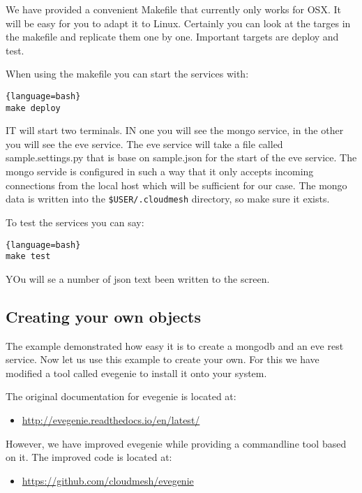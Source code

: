We have provided a convenient Makefile that currently only works for
OSX. It will be easy for you to adapt it to Linux. Certainly you can
look at the targes in the makefile and replicate them one by one.
Important targets are deploy and test.

When using the makefile you can start the services with:

\begin{lstlisting}{language=bash}
make deploy
\end{lstlisting}

IT will start two terminals. IN one you will see the mongo service, in
the other you will see the eve service. The eve service will take a file
called sample.settings.py that is base on sample.json for the start of
the eve service. The mongo servide is configured in such a way that it
only accepts incoming connections from the local host which will be
sufficient for our case. The mongo data is written into the
\verb|$USER/.cloudmesh| directory, so make sure it exists.

To test the services you can say:

\begin{lstlisting}{language=bash}
make test
\end{lstlisting}

YOu will se a number of json text been written to the screen.

\subsection{Creating your own objects}\label{creating-your-own-objects}

The example demonstrated how easy it is to create a mongodb and an eve
rest service. Now let us use this example to create your own. For
this we have modified a tool called evegenie to install it onto your
system.

The original documentation for evegenie is located at:

\begin{itemize}
\item
 \url{http://evegenie.readthedocs.io/en/latest/}
\end{itemize}

However, we have improved evegenie while providing a commandline tool
based on it. The improved code is located at:

\begin{itemize}

\item
 \url{https://github.com/cloudmesh/evegenie}
\end{itemize}

